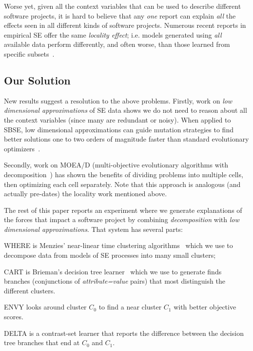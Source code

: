 Worse yet, given all the context variables that can
be used to describe different software projects, it
is hard to believe that any {\em one} report can
explain {\em all} the effects seen in all different
kinds of software projects. Numerous recent reports
in empirical SE offer the same {\em locality
effect}; i.e. models generated using {\em all}
available data perform differently, and often worse, than
those learned from specific subsets~\cite{posnet11,betta12,me12d,yang13,emse12}.

\subsection{Our Solution}

New results suggest a resolution to the above
problems.  Firstly, work on {\em low dimensional
  approximations} of SE data shows we do not
need to reason about all the context variables
(since many are redundant or noisy). When applied to
SBSE, low dimensional approximations can
guide mutation strategies to find
better solutions one to two orders of magnitude
faster than standard evolutionary
optimizers~\cite{krall14,krall14b}.

Secondly, work on MOEA/D (multi-objective
evolutionary algorithms with decomposition~\cite{zhang07:TEC}) has
shown the benefits of dividing  problems into multiple cells, then 
optimizing each cell separately.  Note
that this approach is analogous (and actually
pre-dates) the locality work mentioned above.

The rest of this paper reports an experiment where we generate explanations
of the forces that impact a software project by combining
{\em decomposition} with {\em low dimensional approximations}. That system
has several parts:
\be
\item
WHERE is Menzies'  near-linear time clustering algorithms~\cite{me12d}  which we use to
decompose
data from models of SE processes into many small clusters;
\item 
CART is Brieman's decision tree learner~\cite{breiman84} which we use
to generate finds branches (conjunctions of {\em
  attribute=value} pairs) that most distinguish the
different clusters.
\item 
ENVY looks around cluster $C_0$ to  find a near cluster $C_1$  
with better objective scores.
\item
DELTA is a  contrast-set learner that reports the difference between the
decision tree branches that end at $C_0$ and $C_1$. 
\ee


